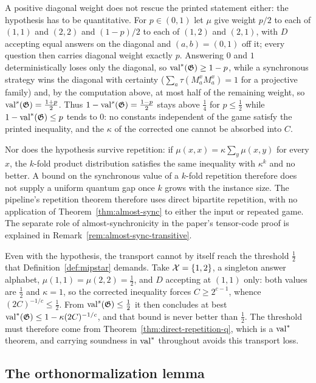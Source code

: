 \begin{remark}
A positive diagonal weight does not rescue the printed statement either: the hypothesis
has to be quantitative. For $p \in (0,1)$ let $\mu$ give weight $p/2$ to each of $(1,1)$
and $(2,2)$ and $(1-p)/2$ to each of $(1,2)$ and $(2,1)$, with $D$ accepting equal answers
on the diagonal and $(a,b) = (0,1)$ off it; every question then carries diagonal weight
exactly $p$. Answering $0$ and $1$ deterministically loses only the diagonal, so
$\mathrm{val}^*(\mathfrak{G}) \geq 1 - p$, while a synchronous strategy wins the diagonal with certainty
($\sum_a \tau(M^x_a M^x_a) = 1$ for a projective family) and, by the computation above, at
most half of the remaining weight, so $\mathrm{val}^{s}(\mathfrak{G}) = \frac{1+p}{2}$. Thus
$1 - \mathrm{val}^{s}(\mathfrak{G}) = \frac{1-p}{2}$ stays above $\frac14$ for $p \leq \frac12$ while
$1 - \mathrm{val}^*(\mathfrak{G}) \leq p$ tends to $0$: no constants independent of the game satisfy the
printed inequality, and the $\kappa$ of the corrected one cannot be absorbed into $C$.

Nor does the hypothesis survive repetition: if $\mu(x,x) = \kappa \sum_y \mu(x,y)$ for
every $x$, the $k$-fold product distribution satisfies the same inequality with $\kappa^k$
and no better. A bound on the synchronous value of a $k$-fold repetition therefore
does not supply a uniform quantum gap once $k$ grows with the instance size. The
pipeline's repetition theorem therefore uses direct bipartite repetition, with no
application of Theorem~\ref{thm:almost-sync} to either the input or repeated game.
The separate role of almost-synchronicity in the paper's tensor-code proof is explained
in Remark~\ref{rem:almost-sync-transitive}.

Even with the hypothesis, the transport cannot by itself reach the threshold
$\frac12$ that Definition~\ref{def:mipstar} demands. Take $\mathcal{X} = \{1,2\}$, a singleton
answer alphabet, $\mu(1,1) = \mu(2,2) = \frac12$, and $D$ accepting at $(1,1)$ only: both
values are $\frac12$ and $\kappa = 1$, so the corrected inequality forces $C \geq
2^{c-1}$, whence $(2C)^{-1/c} \leq \frac12$. From $\mathrm{val}^{s}(\mathfrak{G}) \leq \frac12$ it then
concludes at best $\mathrm{val}^*(\mathfrak{G}) \leq 1 - \kappa (2C)^{-1/c}$, and that bound is never
better than $\frac12$. The threshold must therefore come from
Theorem~\ref{thm:direct-repetition-q}, which is a $\mathrm{val}^*$ theorem, and carrying
soundness in $\mathrm{val}^*$ throughout avoids this transport loss.
\end{remark}

\subsection{The orthonormalization lemma}
\label{sec:rr-orthonormalization}

